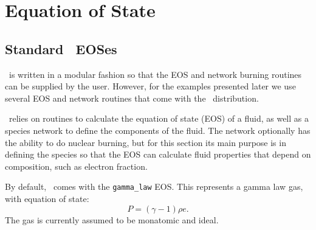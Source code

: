 \section{Equation of State}

\subsection{Standard \castro\ EOSes}

\castro\ is written in a modular fashion so that the EOS and network
burning routines can be supplied by the user. However, for the
examples presented later we use several EOS and network routines
that come with the \castro\ distribution.

\castro\ relies on routines to calculate the equation of state (EOS)
of a fluid, as well as a species network to define the components of
the fluid. The network optionally has the ability to do nuclear burning,
but for this section its main purpose is in defining the species so that
the EOS can calculate fluid properties that depend on composition, such
as electron fraction.

By default, \castro\ comes with the {\tt gamma\_law}
EOS. This represents a gamma law gas, with equation of state:
\begin{equation}
  P = (\gamma - 1) \rho e.
\end{equation}
The gas is currently assumed to be monatomic and ideal.

